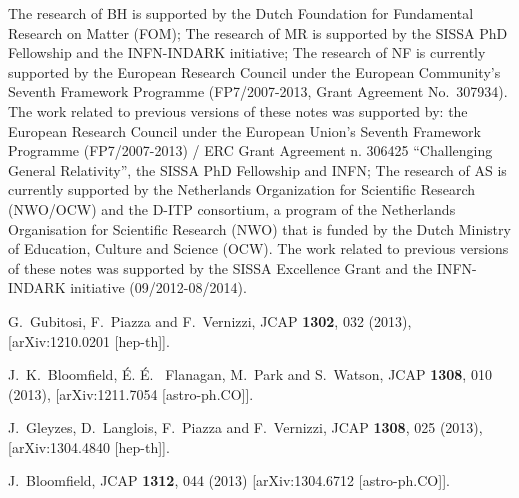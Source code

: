 \documentclass[prd,nofootinbib,showpacs]{revtex4}
\begin{document}
{The research of BH is supported by the Dutch Foundation for Fundamental Research on Matter (FOM); 
The research of MR is supported by the SISSA PhD Fellowship and the INFN-INDARK initiative; 
The research of NF is currently supported by the European Research Council under the European Community's Seventh Framework Programme (FP7/2007-2013, Grant Agreement No.~307934). The  work related to previous versions of these notes was supported by: the European Research Council under the European Union’s Seventh Framework Programme (FP7/2007-2013) / ERC Grant Agreement n. 306425 “Challenging General Relativity”, the SISSA PhD Fellowship and INFN; 
The research of AS is currently supported by the Netherlands Organization for Scientific Research (NWO/OCW) and the D-ITP consortium, a program of the Netherlands Organisation for Scientific Research (NWO) that is funded by the Dutch Ministry of Education, Culture and Science (OCW). The  work related to previous versions of these notes was supported by the SISSA Excellence Grant and the INFN-INDARK  initiative (09/2012-08/2014).

%



\begin{thebibliography}{999}


  G.~Gubitosi, F.~Piazza and F.~Vernizzi,
JCAP {\bf 1302}, 032 (2013),
   [arXiv:1210.0201 [hep-th]]. 
 
  J.~K.~Bloomfield, \'E. \'E. ~Flanagan, M.~Park and S.~Watson,
JCAP {\bf 1308}, 010  (2013),
  [arXiv:1211.7054 [astro-ph.CO]].  
	
  J.~Gleyzes, D.~Langlois, F.~Piazza and F.~Vernizzi,
  JCAP {\bf 1308}, 025 (2013),
   [arXiv:1304.4840 [hep-th]].

  J.~Bloomfield,
  JCAP {\bf 1312}, 044 (2013)
  [arXiv:1304.6712 [astro-ph.CO]].
  

\end{thebibliography}}
\end{document}
